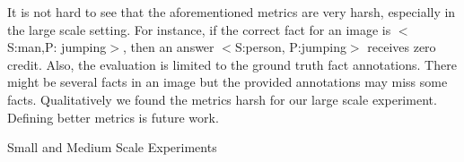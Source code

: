 \documentclass[runningheads]{llncs}
\begin{document}
It is not hard to see that the aforementioned metrics are very harsh, especially in the large scale setting. For instance, if the correct fact for an image is $<$S:man,P:  jumping$>$, then an answer $<$S:person, P:jumping$>$ receives zero credit. Also, the evaluation is limited to the ground truth fact annotations. There might be several facts in an image but the provided annotations may miss some facts. Qualitatively we found the metrics harsh for our large scale experiment. 
Defining better metrics is future work. 
\vspace{-10mm}
\centering
 \caption{Small and Medium Scale Experiments}
  \label{ttbl_smDS}
\end{document}
